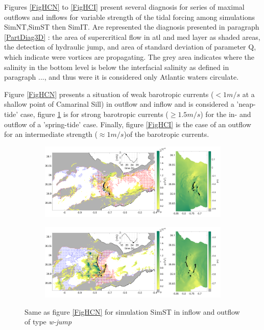 Figures \ref{FigHCN} to \ref{FigHCI} present several diagnosis for series of maximal outflows and inflows for variable strength of the tidal forcing among simulations SimNT,SimST then SimIT. Are represented the diagnosis presented in paragraph \ref{PartDiag3D} : the area of supercritical flow in atl and med layer as shaded areas, the detection of hydraulic jump, and area of standard deviation of parameter Q, which indicate were vortices are propagating. The grey area indicates where the salinity in the bottom level is below the interfacial salinity as defined in paragraph ..., and thus were it is considered only Atlantic waters circulate.

Figure \ref{FigHCN} presents a situation of weak barotropic currents ($<1m/s$ at a shallow point of Camarinal Sill) in outflow and inflow and is considered a 'neap-tide' case, figure \ref{FigHCS} is for strong barotropic currents ($\geq 1.5m/s$) for the in- and outflow of a 'spring-tide' case. Finally, figure \ref{FigHCI} is the case of an outflow for an intermediate strength ($\approx 1m/s$)of the barotropic currents.

\begin{figure}[!h]
 \centering
\begin{subfigure}{\linewidth}
\centering
\includegraphics[width=\linewidth]{./GBR3D/VE2_19h30_p.png}
\end{subfigure}

\begin{subfigure}{\linewidth}
\centering
\includegraphics[width=\linewidth]{./GBR3D/VE2_25h_p.png}
\end{subfigure}
\caption {Same as figure \ref{FigHCN} for simulation SimST in inflow and outflow of type \textit{w-jump}}
\label{FigHCS}
\end{figure}

